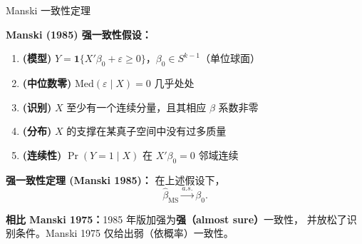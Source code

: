 \documentclass[aspectratio=169, 10pt]{beamer}
\begin{document}
\begin{frame}{Manski 一致性定理}

  \begin{assumptionbox}
  \textbf{Manski (1985) 强一致性假设：}
  \begin{enumerate}\setlength{\itemsep}{1pt}
    \item \textbf{(模型)} $Y = \mathbf{1}\{X'\beta_0 + \varepsilon \geq 0\}$，$\beta_0 \in S^{k-1}$（单位球面）
    \item \textbf{(中位数零)} $\text{Med}(\varepsilon \mid X) = 0$ 几乎处处
    \item \textbf{(识别)} $X$ 至少有一个连续分量，且其相应 $\beta$ 系数非零
    \item \textbf{(分布)} $X$ 的支撑在某真子空间中没有过多质量
    \item \textbf{(连续性)} $\Pr(Y=1\mid X)$ 在 $X'\beta_0 = 0$ 邻域连续
  \end{enumerate}
  \end{assumptionbox}

  \begin{highlightbox}
    \textbf{强一致性定理 (Manski 1985)：}
    在上述假设下，
    $$\hat\beta_{\text{MS}} \overset{a.s.}{\to} \beta_0.$$
  \end{highlightbox}

  \begin{keybox}
    \textbf{相比 Manski 1975：}1985 年版加强为\textbf{强（almost sure）}一致性，
    并放松了识别条件。Manski 1975 仅给出弱（依概率）一致性。
  \end{keybox}

  \hypertarget{main-c12}{}
  \hfill{\scriptsize\hyperlink{proof-c12}{}}

\end{frame}
\end{document}
